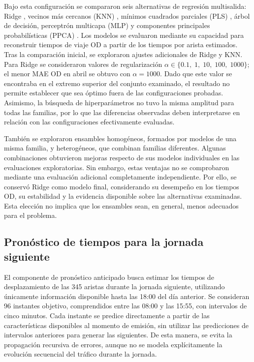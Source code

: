 \documentclass[letterpaper,11pt]{article}
\begin{document}
Bajo esta configuración se compararon seis alternativas de regresión multisalida: Ridge \parencite{hoerl1970}, vecinos más cercanos (KNN) \parencite{cover1967}, mínimos cuadrados parciales (PLS) \parencite{wold2001}, árbol de decisión, perceptrón multicapa (MLP) y componentes principales probabilísticas (PPCA) \parencite{tipping1999}. Los modelos se evaluaron mediante su capacidad para reconstruir tiempos de viaje OD a partir de los tiempos por arista estimados. Tras la comparación inicial, se exploraron ajustes adicionales de Ridge y KNN. Para Ridge se consideraron valores de regularización $\alpha\in\{0.1,\;1,\;10,\;100,\;1000\}$; el menor MAE OD en abril se obtuvo con $\alpha=1000$. Dado que este valor se encontraba en el extremo superior del conjunto examinado, el resultado no permite establecer que sea óptimo fuera de las configuraciones probadas. Asimismo, la búsqueda de hiperparámetros no tuvo la misma amplitud para todas las familias, por lo que las diferencias observadas deben interpretarse en relación con las configuraciones efectivamente evaluadas.

También se exploraron ensambles homogéneos, formados por modelos de una misma familia, y heterogéneos, que combinan familias diferentes. Algunas combinaciones obtuvieron mejoras respecto de sus modelos individuales en las evaluaciones exploratorias. Sin embargo, estas ventajas no se comprobaron mediante una evaluación adicional completamente independiente. Por ello, se conservó Ridge como modelo final, considerando su desempeño en los tiempos OD, su estabilidad y la evidencia disponible sobre las alternativas examinadas. Esta elección no implica que los ensambles sean, en general, menos adecuados para el problema.


\subsection{Pronóstico de tiempos para la jornada siguiente}

El componente de pronóstico anticipado busca estimar los tiempos de desplazamiento de las 345 aristas durante la jornada siguiente, utilizando únicamente información disponible hasta las 18:00 del día anterior. Se consideran 96 instantes objetivo, comprendidos entre las 08:00 y las 15:55, con intervalos de cinco minutos. Cada instante se predice directamente a partir de las características disponibles al momento de emisión, sin utilizar las predicciones de intervalos anteriores para generar las siguientes. De esta manera, se evita la propagación recursiva de errores, aunque no se modela explícitamente la evolución secuencial del tráfico durante la jornada.
\end{document}
